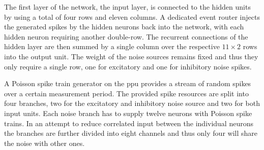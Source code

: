 The first layer of the network, the input layer, is connected to the hidden units by using a total of four rows and eleven columns. A dedicated event router injects the generated spikes by the hidden neurons back into the network, with each hidden neuron requiring another double-row. The recurrent connections of the hidden layer are then summed by a single column over the respective $11 \times 2$ rows into the output unit. The weight of the noise sources remains fixed and thus they only require a single row, one for excitatory and one for inhibitory noise spikes.

A Poisson spike train generator on the \gls{ppu} provides a stream of random spikes over a certain measurement period. The provided spike resources are split into four branches, two for the excitatory and inhibitory noise source and two for both input units. Each noise branch has to supply twelve neurons with Poisson spike trains. In an attempt to reduce correlated input between the individual neurons the branches are further divided into eight channels and thus only four will share the noise with other ones.

